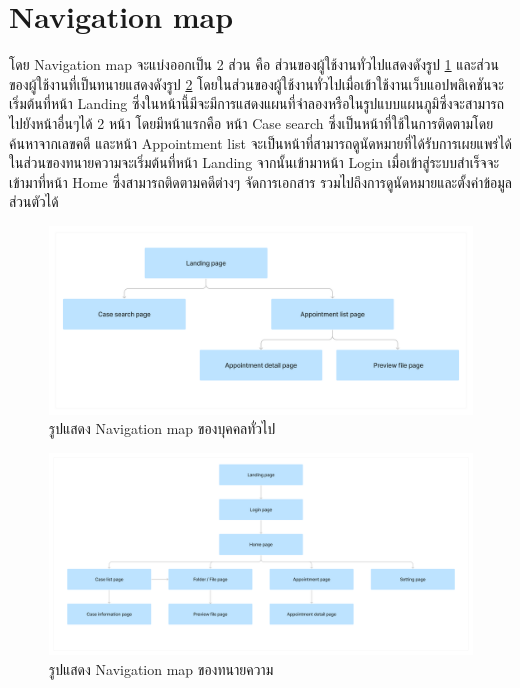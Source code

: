 \documentclass[12pt,oneside,openright,a4paper]{cpe-thai-project}
\begin{document}
\section{Navigation map}
โดย Navigation map จะแบ่งออกเป็น 2 ส่วน คือ ส่วนของผู้ใช้งานทั่วไปแสดงดังรูป \ref{fig:navMapGuest} และส่วนของผู้ใช้งานที่เป็นทนายแสดงดังรูป \ref{fig:navMapLawyer} โดยในส่วนของผู้ใช้งานทั่วไปเมื่อเข้าใช้งานเว็บแอปพลิเคชันจะเริ่มต้นที่หน้า Landing ซึ่งในหน้านี้มีจะมีการแสดงแผนที่จำลองหรือในรูปแบบแผนภูมิซึ่งจะสามารถไปยังหน้าอื่นๆได้ 2 หน้า โดยมีหน้าแรกคือ 
หน้า Case search ซึ่งเป็นหน้าที่ใช้ในการติดตามโดยค้นหาจากเลขคดี และหน้า Appointment list จะเป็นหน้าที่สามารถดูนัดหมายที่ได้รับการเผยแพร่ได้  \hspace{1cm}ในส่วนของทนายความจะเริ่มต้นที่หน้า Landing จากนั้นเข้ามาหน้า Login เมื่อเข้าสู่ระบบสำเร็จจะเข้ามาที่หน้า Home ซึ่งสามารถติดตามคดีต่างๆ จัดการเอกสาร รวมไปถึงการดูนัดหมายและตั้งค่าข้อมูลส่วนตัวได้
\begin{figure}[!ht]\centering
    \includegraphics[width=13cm]{./assets/nav-map-guest.png}
    \caption{รูปแสดง Navigation map ของบุคคลทั่วไป}\label{fig:navMapGuest}

  \end{figure}

\begin{figure}[!ht]\centering
    \includegraphics[width=13cm]{./assets/nav-map-lawyer.png}
    \caption{รูปแสดง Navigation map ของทนายความ}\label{fig:navMapLawyer}
\end{figure}
\clearpage
\newpage
\end{document}
